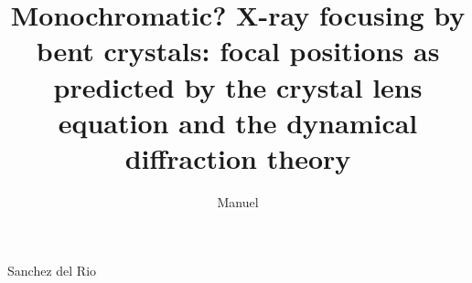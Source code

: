 \documentclass[preprint]{iucr}              %
\newcommand{\inred}[1]{{\color{red}#1}}
\begin{document}



\title{\inred{Monochromatic?} X-ray focusing by bent crystals: focal positions as predicted by the crystal lens equation and the dynamical diffraction theory}
%


\author[a]{Manuel}{Sanchez del Rio}











\end{document}
